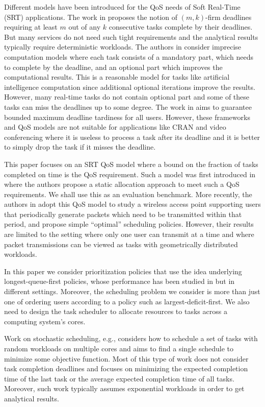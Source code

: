 \documentclass[prodmode,acmtompecs]{acmsmall}
\newcommand{\add}[1]{#1}
\begin{document}
Different models have been introduced for the QoS needs of Soft Real-Time (SRT) applications. 
The work in \cite{HaR95,BeB97,Ram99} proposes the notion of $(m, k)$-firm deadlines requiring at least $m$ out of any $k$ consecutive tasks complete by their deadlines. 
But many services do not need such tight requirements and \add{the analytical results typically require deterministic workloads}. 
The authors in \cite{LLN87,HoK13b} consider imprecise computation models where each task consists of a mandatory part, which needs to complete by the deadline, and an optional part which improves the computational results. This is a reasonable model for tasks like artificial intelligence computation since additional optional iterations improve the results. However, many real-time tasks do not contain optional part and some of these tasks can miss the deadlines up to some degree. 
The work in \cite{LiA09} aims to guarantee bounded maximum deadline tardiness for all users. 
However, these frameworks and QoS models are not suitable for applications like CRAN and video conferencing where it is useless to process a task after its deadline and it is better to simply drop the task if it misses the deadline. 

This paper focuses on an SRT QoS model where a bound on the fraction of tasks completed on time is the QoS requirement. 
Such a model was first introduced in \cite{AtB98} where the authors propose a static allocation approach to meet such a QoS requirements. We shall use this as an evaluation benchmark. 
More recently, the authors in \cite{HoK13b,HoK12} adopt this QoS model to study a wireless access point supporting users that periodically generate packets which need to be transmitted within that period, and propose simple ``optimal'' scheduling policies. However, their results are limited to the setting where only one user can transmit at a time and where packet transmissions can be viewed as tasks with geometrically distributed workloads. 


In this paper we consider prioritization policies that use the idea underlying longest-queue-first policies, whose performance has been studied in \cite{DiW06,JLS07,KWJ13} but in different settings. Moreover, the scheduling problem we consider is more than just one of ordering users according to a policy such as largest-deficit-first. We also need to design the task scheduler to allocate resources to tasks across a computing system's cores. 

Work on stochastic scheduling, e.g., \cite{BCS74,LLK93,Pin12b,AGG10,BDW86,AlS03} considers how to schedule a set of tasks with random workloads on multiple cores and aims to find a single schedule to minimize some objective function. Most of this type of work does not consider task completion deadlines and focuses on minimizing the expected completion time of the last task or the average expected completion time of all tasks. Moreover, such work typically assumes exponential workloads in order to get analytical results.  
\end{document}
